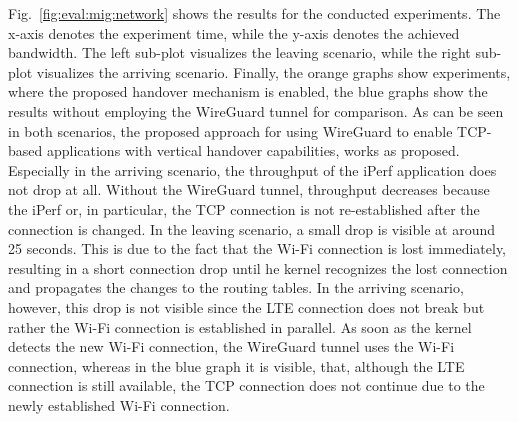 Fig.~\ref{fig:eval:mig:network} shows the results for the conducted experiments.
The x-axis denotes the experiment time, while the y-axis denotes the achieved bandwidth.
The left sub-plot visualizes the leaving scenario, while the right sub-plot visualizes the arriving scenario.
Finally, the orange graphs show experiments, where the proposed handover mechanism is enabled, the blue graphs show the results without employing the WireGuard tunnel for comparison.
As can be seen in both scenarios, the proposed approach for using WireGuard to enable TCP-based applications with vertical handover capabilities, works  as proposed.
Especially in the arriving scenario, the throughput of the iPerf application does not drop at all.
Without the WireGuard tunnel, throughput decreases because the iPerf or, in particular, the TCP connection is not re-established after the connection is changed.
In the leaving scenario, a small drop is visible at around 25 seconds.
This is due to the fact that the Wi-Fi connection is lost immediately, resulting in a short connection drop until he kernel recognizes the lost connection and propagates the changes to the routing tables.
In the arriving scenario, however, this drop is not visible since the LTE connection does not break but rather the Wi-Fi connection is established in parallel.
As soon as the kernel detects the new Wi-Fi connection, the WireGuard tunnel uses the Wi-Fi connection, whereas in the blue graph it is visible, that, although the LTE connection is still available, the TCP connection does not continue due to the newly established Wi-Fi connection.


